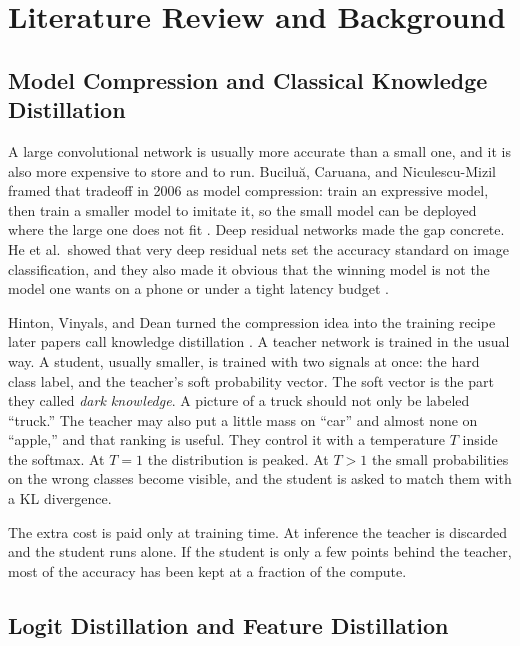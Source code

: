 \documentclass[11pt]{article}
\begin{document}
\section{Literature Review and Background}
\label{sec:lit}

\subsection{Model Compression and Classical Knowledge Distillation}

A large convolutional network is usually more accurate than a small one, and it is also more expensive to store and to run. Bucilu\u{a}, Caruana, and Niculescu-Mizil framed that tradeoff in 2006 as model compression: train an expressive model, then train a smaller model to imitate it, so the small model can be deployed where the large one does not fit \cite{bucilua2006}. Deep residual networks made the gap concrete. He et al.\ showed that very deep residual nets set the accuracy standard on image classification, and they also made it obvious that the winning model is not the model one wants on a phone or under a tight latency budget \cite{he2016}.

Hinton, Vinyals, and Dean turned the compression idea into the training recipe later papers call knowledge distillation \cite{hinton2015}. A teacher network is trained in the usual way. A student, usually smaller, is trained with two signals at once: the hard class label, and the teacher's soft probability vector. The soft vector is the part they called \emph{dark knowledge}. A picture of a truck should not only be labeled ``truck.'' The teacher may also put a little mass on ``car'' and almost none on ``apple,'' and that ranking is useful. They control it with a temperature \(T\) inside the softmax. At \(T = 1\) the distribution is peaked. At \(T > 1\) the small probabilities on the wrong classes become visible, and the student is asked to match them with a KL divergence.

The extra cost is paid only at training time. At inference the teacher is discarded and the student runs alone. If the student is only a few points behind the teacher, most of the accuracy has been kept at a fraction of the compute.

\subsection{Logit Distillation and Feature Distillation}
\end{document}
